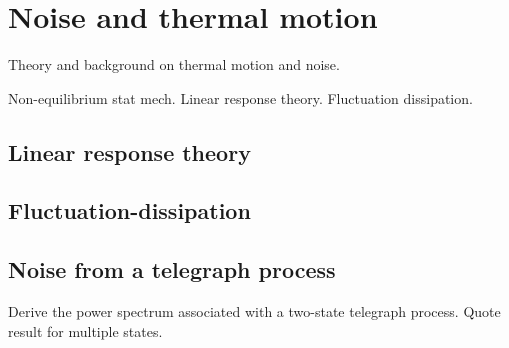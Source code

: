 \chapter{Noise and thermal motion}
\label{noise}

Theory and background on thermal motion and noise.

Non-equilibrium stat mech.  Linear response theory.  Fluctuation dissipation.

\section{Linear response theory}

\section{Fluctuation-dissipation}


\section{Noise from a telegraph process}

Derive the power spectrum associated with a two-state telegraph process.  Quote result for multiple states.